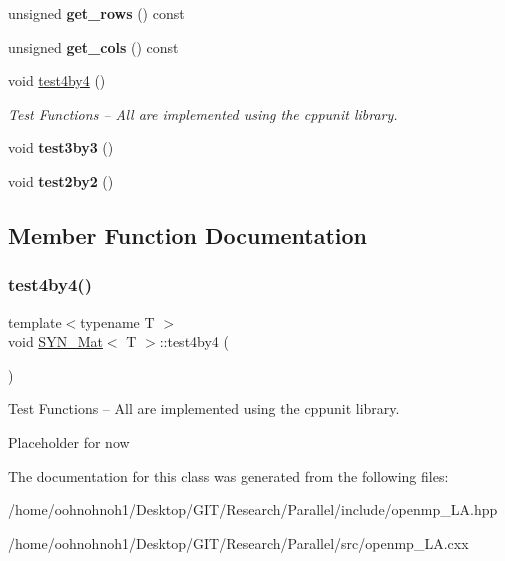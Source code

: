 \begin{DoxyCompactItemize}
\item 
\mbox{\label{classSYN__Mat_af5ad6b2b5195b2b639699969ee2cdd8f}} 
unsigned {\bfseries get\+\_\+rows} () const
\item 
\mbox{\label{classSYN__Mat_a81c260deeb47134793364247264afc71}} 
unsigned {\bfseries get\+\_\+cols} () const
\item 
void \hyperlink{classSYN__Mat_a7bfde7d0c295a4669c4a8718c01c1f5c}{test4by4} ()
\begin{DoxyCompactList}\small\item\em Test Functions -- All are implemented using the cppunit library. \end{DoxyCompactList}\item 
\mbox{\label{classSYN__Mat_a96c885098291702cea2ecfbb41fd413c}} 
void {\bfseries test3by3} ()
\item 
\mbox{\label{classSYN__Mat_a204da2635fd42c733d2cb08b8e573981}} 
void {\bfseries test2by2} ()
\end{DoxyCompactItemize}


\subsection{Member Function Documentation}
\mbox{\label{classSYN__Mat_a7bfde7d0c295a4669c4a8718c01c1f5c}} 
\subsubsection{\texorpdfstring{test4by4()}{test4by4()}}
{\footnotesize\ttfamily template$<$typename T $>$ \\
void \hyperlink{classSYN__Mat}{S\+Y\+N\+\_\+\+Mat}$<$ T $>$\+::test4by4 (\begin{DoxyParamCaption}{ }\end{DoxyParamCaption})}



Test Functions -- All are implemented using the cppunit library. 

Placeholder for now 

The documentation for this class was generated from the following files\+:\begin{DoxyCompactItemize}
\item 
/home/oohnohnoh1/\+Desktop/\+G\+I\+T/\+Research/\+Parallel/include/openmp\+\_\+\+L\+A.\+hpp\item 
/home/oohnohnoh1/\+Desktop/\+G\+I\+T/\+Research/\+Parallel/src/openmp\+\_\+\+L\+A.\+cxx\end{DoxyCompactItemize}

